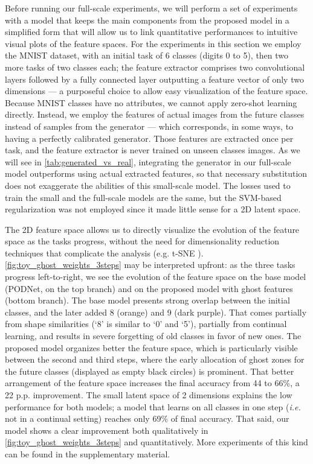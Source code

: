 Before running our full-scale experiments, we will perform a set of experiments with a model that
keeps the main components from the proposed model in a simplified form that will allow us to link
quantitative performances to intuitive visual plots of the feature spaces. For the experiments in
this section we employ the MNIST \cite{lecun2010mnist} dataset, with an initial task of 6 classes
(digits 0 to 5), then two more tasks of two classes each; the feature extractor comprises two
convolutional layers followed by a fully connected layer outputting a feature vector of only two
dimensions — a purposeful choice to allow easy visualization of the feature space. Because MNIST
classes have no attributes, we cannot apply zero-shot learning directly. Instead, we employ the
features of actual images from the future classes instead of samples from the generator — which
corresponds, in some ways, to having a perfectly calibrated generator. Those features are extracted
once per task, and the feature extractor is never trained on unseen classes images. As we will see
in \autoref{tab:generated_vs_real}, integrating the generator in our full-scale model outperforms
using actual extracted features, so that necessary substitution does not exaggerate the abilities of
this small-scale model. The losses used to train the small and the full-scale models are the same,
but the SVM-based regularization was not employed since it made little sense for a 2D latent space.

The 2D feature space allows us to directly visualize the evolution of the feature space as the tasks
progress, without the need for dimensionality reduction techniques that complicate the analysis
(e.g. t-SNE \cite{maaten2008tsne}). \autoref{fig:toy_ghost_weights_3steps} may be interpreted
upfront: as the three tasks progress left-to-right, we see the evolution of the feature space on the
base model (PODNet, on the top branch) and on the proposed model with ghost features (bottom
branch). The base model presents strong overlap between the initial classes, and the later added  8
({\color{orange}orange}) and 9 ({\color{violet}dark purple}). That comes partially from shape
similarities (‘8’ is similar to ‘0’ and ‘5’), partially from continual learning, and results in
severe forgetting of old classes in favor of new ones. The proposed model organizes better the
feature space, which is particularly visible between the second and third steps, where the early
allocation of ghost zones for the future classes (displayed as empty black circles) is prominent.
That better arrangement of the feature space increases the final accuracy from 44 to 66\%, a 22 p.p.
improvement. The small latent space of 2 dimensions explains the low performance for both models; a
model that learns on all classes in one step (\textit{i.e.} not in a continual setting) reaches only
69\% of final accuracy. That said, our model shows a clear improvement both qualitatively in
\autoref{fig:toy_ghost_weights_3steps} and quantitatively. More experiments of this kind can be
found in the supplementary material.

